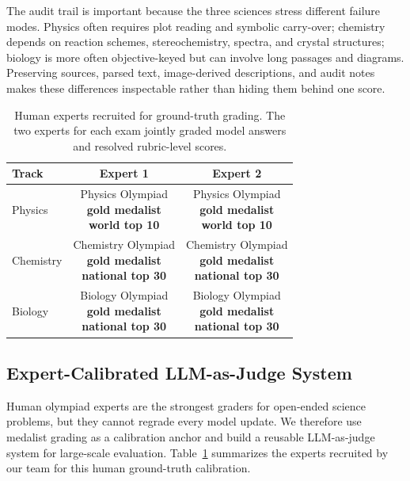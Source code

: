 \documentclass[11pt]{article}
\newcommand{\RankOne}[1]{\textbf{\textcolor{yellow!50!orange}{#1}}}
\newcommand{\strong}[1]{\textbf{\textcolor{red!70!black}{#1}}} %
\begin{document}
The audit trail is important because the three sciences stress different failure modes.
Physics often requires plot reading and symbolic carry-over; chemistry depends on reaction schemes, stereochemistry, spectra, and crystal structures; biology is more often objective-keyed but can involve long passages and diagrams.
Preserving sources, parsed text, image-derived descriptions, and audit notes makes these differences inspectable rather than hiding them behind one score.



\begin{table}[ht]
\vspace{-0.2cm}
\centering
\footnotesize
\setlength{\tabcolsep}{4pt}
\renewcommand{\arraystretch}{1.15}
\begin{tabular}{l c c}
\toprule
\textbf{Track} & \textbf{Expert 1} & \textbf{Expert 2} \\
\midrule
Physics &
\makecell{Physics Olympiad\\\RankOne{gold medalist}\\\strong{world top 10}} &
\makecell{Physics Olympiad\\\RankOne{gold medalist}\\\strong{world top 10}} \\
\midrule
Chemistry &
\makecell{Chemistry Olympiad\\\RankOne{gold medalist}\\\strong{national top 30}} &
\makecell{Chemistry Olympiad\\\RankOne{gold medalist}\\\strong{national top 30}} \\
\midrule
Biology &
\makecell{Biology Olympiad\\\RankOne{gold medalist}\\\strong{national top 30}} &
\makecell{Biology Olympiad\\\RankOne{gold medalist}\\\strong{national top 30}} \\
\bottomrule
\end{tabular}
\caption{Human experts recruited for ground-truth grading. The two experts for each exam jointly graded model answers and resolved rubric-level scores.}
\label{tab:human-graders}
\vspace{-0.3cm}
\end{table}



\subsection{Expert-Calibrated LLM-as-Judge System}
\label{sec:judge-system}
Human olympiad experts are the strongest graders for open-ended science problems, but they cannot regrade every model update.
We therefore use medalist grading as a calibration anchor and build a reusable LLM-as-judge system for large-scale evaluation.
Table~\ref{tab:human-graders} summarizes the experts recruited by our team for this human ground-truth calibration.
\end{document}
